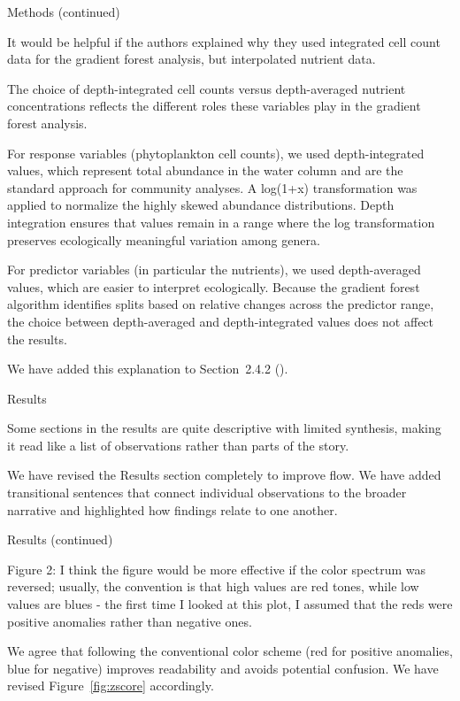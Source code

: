 \documentclass[12pt,english]{reviewresponse}
\begin{document}
\begin{revcomment}
	Methods (continued)
    
    It would be helpful if the authors explained why they used integrated cell count data for the gradient forest analysis, but interpolated nutrient data.
\end{revcomment}
\begin{revresponse}
    The choice of depth-integrated cell counts versus depth-averaged nutrient concentrations reflects the different roles these variables play in the gradient forest analysis.
    
    For response variables (phytoplankton cell counts), we used depth-integrated values, which represent total abundance in the water column and are the standard approach for community analyses. A log(1+x) transformation was applied to normalize the highly skewed abundance distributions. Depth integration ensures that values remain in a range where the log transformation preserves ecologically meaningful variation among genera. 
    
    For predictor variables (in particular the nutrients), we used depth-averaged values, which are easier to interpret ecologically. Because the gradient forest algorithm identifies splits based on relative changes across the predictor range, the choice between depth-averaged and depth-integrated values does not affect the results.
    
    We have added this explanation to Section~2.4.2 ().
\end{revresponse}


\begin{revcomment}
	Results

    Some sections in the results are quite descriptive with limited synthesis, making it read like a list of observations rather than parts of the story.
\end{revcomment}
\begin{revresponse}
    We have revised the Results section completely to improve flow. We have added transitional sentences that connect individual observations to the broader narrative and highlighted how findings relate to one another.
\end{revresponse}

\begin{revcomment}
	Results (continued)

    Figure 2: I think the figure would be more effective if the color spectrum was reversed; usually, the convention is that high values are red tones, while low values are blues - the first time I looked at this plot, I assumed that the reds were positive anomalies rather than negative ones.
\end{revcomment}
\begin{revresponse}
    We agree that following the conventional color scheme (red for positive anomalies, blue for negative) improves readability and avoids potential confusion. We have revised Figure~\ref{fig:zscore} accordingly.
\end{revresponse}
\end{document}
